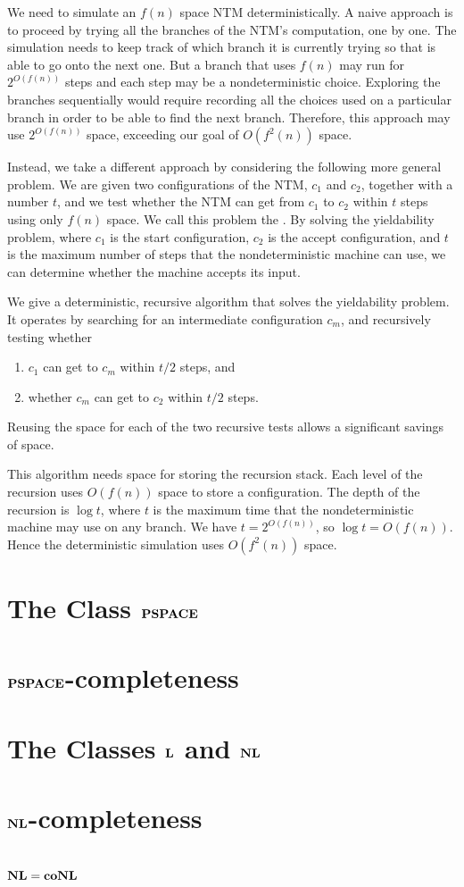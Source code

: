 \documentclass[11pt,twoside=off,numbers=noenddot]{scrbook}
\begin{document}
\begin{proofidea}
    We need to simulate an $f(n)$ space NTM deterministically. A naive approach is to proceed by trying all the branches of the NTM's computation, one by one. The simulation needs to keep track of which branch it is currently trying so that is able to go onto the next one. But a branch that uses $f(n)$ may run for $2^{O(f(n))}$ steps and each step may be a nondeterministic choice. Exploring the branches sequentially would require recording all the choices used on a particular branch in order to be able to find the next branch. Therefore, this approach may use $2^{O(f(n))}$ space, exceeding our goal of $O(f^{2}(n))$ space.

    Instead, we take a different approach by considering the following more general problem. We are given two configurations of the NTM, $c_1$ and $c_2$, together with a number $t$, and we test whether the NTM can get from $c_1$ to $c_2$ within $t$ steps using only $f(n)$ space. We call this problem the . By solving the yieldability problem, where $c_1$ is the start configuration, $c_2$ is the accept configuration, and $t$ is the maximum number of steps that the nondeterministic machine can use, we can determine whether the machine accepts its input.

    We give a deterministic, recursive algorithm that solves the yieldability problem. It operates by searching for an intermediate configuration $c_m$, and recursively testing whether
    \begin{enumerate}
        \item $c_1$ can get to $c_m$ within $t/2$ steps, and
        \item whether $c_m$ can get to $c_2$ within $t/2$ steps.
    \end{enumerate}
    Reusing the space for each of the two recursive tests allows a significant savings of space.

    This algorithm needs space for storing the recursion stack. Each level of the recursion uses $O(f(n))$ space to store a configuration. The depth of the recursion is $\log t$, where $t$ is the maximum time that the nondeterministic machine may use on any branch. We have $t = 2^{O(f(n))}$, so $\log t = O(f(n))$. Hence the deterministic simulation uses $O(f^2(n))$ space.
\end{proofidea}

\section{The Class $\textbf{PSPACE}$}

\section{$\textbf{PSPACE}$-completeness}

\section{The Classes $\textbf{L}$ and $\textbf{NL}$}

\section{$\textbf{NL}$-completeness}

\section{$\textbf{NL} = \textbf{coNL}$}
\end{document}
